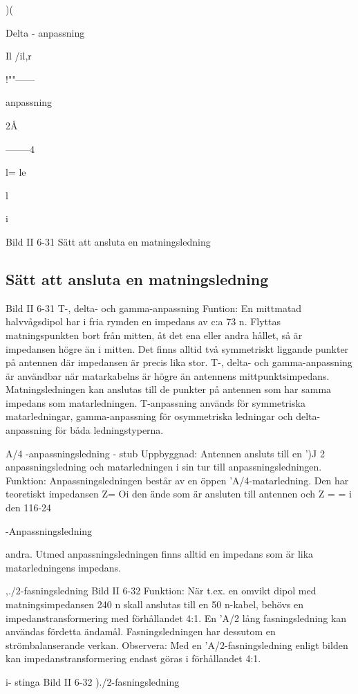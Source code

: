 )(

Delta - anpassning

Il
/il,r

!""------

anpassning

2Å

--------4

l= le~

l

i

Bild II 6-31 Sätt att ansluta en matningsledning

\subsection{Sätt att ansluta en matningsledning}

Bild II 6-31
T-, delta- och gamma-anpassning
Funtion: En mittmatad halvvågsdipol har
i fria rymden en impedans av c:a 73 n.
Flyttas matningspunkten bort från mitten, åt det ena eller andra hållet, så är
impedansen högre än i mitten.
Det finns alltid två symmetriskt liggande
punkter på antennen där impedansen är
precis lika stor.
T-, delta- och gamma-anpassning är användbar när matarkabelns
är högre än antennens mittpunktsimpedans. Matningsledningen kan anslutas till de punkter
på antennen som har samma impedans
som matarledningen. T-anpassning används för symmetriska matarledningar, gamma-anpassning för osymmetriska ledningar
och delta-anpassning för båda ledningstyperna.

A/4 -anpassningsledning - stub
Uppbyggnad: Antennen ansluts till en ')J
2 anpassningsledning och matarledningen
i sin tur till anpassningsledningen.
Funktion: Anpassningsledningen består
av en öppen 'A/4-matarledning. Den har
teoretiskt impedansen Z= Oi den ände som
är ansluten till antennen och Z = = i den
116-24

-Anpassningsledning

andra. Utmed anpassningsledningen finns
alltid en impedans som är lika matarledningens impedans.

,./2-fasningsledning
Bild II 6-32
Funktion: När t.ex. en omvikt dipol med
matningsimpedansen 240 n skall anslutas
till en 50 n-kabel, behövs en impedanstransformering med förhållandet 4:1. En 'A/2
lång fasningsledning kan användas fördetta
ändamål. Fasningsledningen har dessutom
en strömbalanserande verkan.
Observera: Med en 'A/2-fasningsledning
enligt bilden kan impedanstransformering
endast göras i förhållandet 4:1.

i- stinga
Bild II 6-32 )./2-fasningsledning

